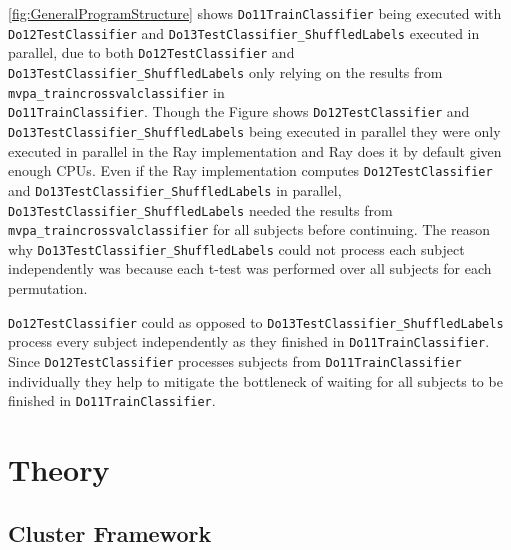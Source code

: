 \documentclass[12pt, a4paper]{article}
\begin{document}

\cref{fig:GeneralProgramStructure} shows \texttt{Do11TrainClassifier} being executed with \texttt{Do12TestClassifier} and \texttt{Do13TestClassifier\_ShuffledLabels} executed in parallel, due to both \texttt{Do12TestClassifier} and \texttt{Do13TestClassifier\_ShuffledLabels} only relying on the results from \texttt{mvpa\_traincrossvalclassifier} in\\
\texttt{Do11TrainClassifier}.
Though the Figure shows \texttt{Do12TestClassifier} and \texttt{Do13TestClassifier\_ShuffledLabels} being executed in parallel they were only executed in parallel in the Ray implementation and Ray does it by default given enough CPUs.
Even if the Ray implementation computes \texttt{Do12TestClassifier} and \texttt{Do13TestClassifier\_ShuffledLabels} in parallel, \texttt{Do13TestClassifier\_ShuffledLabels} needed the results from \texttt{mvpa\_traincrossvalclassifier} for all subjects before continuing.
The reason why \texttt{Do13TestClassifier\_ShuffledLabels} could not process each subject independently was because each t-test was performed over all subjects for each permutation.

\texttt{Do12TestClassifier} could as opposed to \texttt{Do13TestClassifier\_ShuffledLabels} process every subject independently as they finished in \texttt{Do11TrainClassifier}.
Since \texttt{Do12TestClassifier} processes subjects from \texttt{Do11TrainClassifier} individually they help to mitigate the bottleneck of waiting for all subjects to be finished in \texttt{Do11TrainClassifier}.
 

\section{Theory}

\subsection{Cluster Framework}
\end{document}
